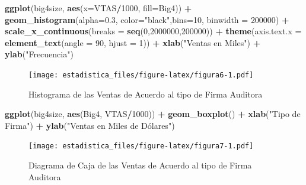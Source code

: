 \documentclass[]{book}
\newenvironment{Shaded}{\begin{snugshade}}{\end{snugshade}}
\newcommand{\KeywordTok}[1]{\textcolor[rgb]{0.13,0.29,0.53}{\textbf{#1}}}
\newcommand{\DataTypeTok}[1]{\textcolor[rgb]{0.13,0.29,0.53}{#1}}
\newcommand{\DecValTok}[1]{\textcolor[rgb]{0.00,0.00,0.81}{#1}}
\newcommand{\FloatTok}[1]{\textcolor[rgb]{0.00,0.00,0.81}{#1}}
\newcommand{\StringTok}[1]{\textcolor[rgb]{0.31,0.60,0.02}{#1}}
\newcommand{\OperatorTok}[1]{\textcolor[rgb]{0.81,0.36,0.00}{\textbf{#1}}}
\newcommand{\NormalTok}[1]{#1}
\begin{document}
\begin{Shaded}
\begin{Highlighting}[]
\KeywordTok{ggplot}\NormalTok{(big4size, }\KeywordTok{aes}\NormalTok{(}\DataTypeTok{x=}\NormalTok{VTAS}\OperatorTok{/}\DecValTok{1000}\NormalTok{, }\DataTypeTok{fill=}\NormalTok{Big4)) }\OperatorTok{+}\StringTok{ }
\StringTok{  }\KeywordTok{geom_histogram}\NormalTok{(}\DataTypeTok{alpha=}\FloatTok{0.3}\NormalTok{, }\DataTypeTok{color=}\StringTok{"black"}\NormalTok{,}\DataTypeTok{bins=}\DecValTok{10}\NormalTok{, }\DataTypeTok{binwidth =} \DecValTok{200000}\NormalTok{) }\OperatorTok{+}
\StringTok{  }\KeywordTok{scale_x_continuous}\NormalTok{(}\DataTypeTok{breaks =} \KeywordTok{seq}\NormalTok{(}\DecValTok{0}\NormalTok{,}\DecValTok{2000000}\NormalTok{,}\DecValTok{200000}\NormalTok{)) }\OperatorTok{+}
\StringTok{  }\KeywordTok{theme}\NormalTok{(}\DataTypeTok{axis.text.x =} \KeywordTok{element_text}\NormalTok{(}\DataTypeTok{angle =} \DecValTok{90}\NormalTok{, }\DataTypeTok{hjust =} \DecValTok{1}\NormalTok{)) }\OperatorTok{+}
\StringTok{  }\KeywordTok{xlab}\NormalTok{(}\StringTok{"Ventas en Miles"}\NormalTok{) }\OperatorTok{+}\StringTok{ }\KeywordTok{ylab}\NormalTok{(}\StringTok{"Frecuencia"}\NormalTok{) }
\end{Highlighting}
\end{Shaded}

\begin{figure}
\centering
\texttt{[image: estadistica\_files/figure-latex/figura6-1.pdf]}
\caption{\label{fig:figura6}Histograma de las Ventas de Acuerdo al tipo de
Firma Auditora}
\end{figure}

\begin{Shaded}
\begin{Highlighting}[]
\KeywordTok{ggplot}\NormalTok{(big4size, }\KeywordTok{aes}\NormalTok{(Big4, VTAS}\OperatorTok{/}\DecValTok{1000}\NormalTok{)) }\OperatorTok{+}\StringTok{ }
\StringTok{  }\KeywordTok{geom_boxplot}\NormalTok{() }\OperatorTok{+}\StringTok{ }\KeywordTok{xlab}\NormalTok{(}\StringTok{"Tipo de Firma"}\NormalTok{) }\OperatorTok{+}
\StringTok{  }\KeywordTok{ylab}\NormalTok{(}\StringTok{"Ventas en Miles de Dólares")}
\end{Highlighting}
\end{Shaded}

\begin{figure}
\centering
\texttt{[image: estadistica\_files/figure-latex/figura7-1.pdf]}
\caption{\label{fig:figura7}Diagrama de Caja de las Ventas de Acuerdo al
tipo de Firma Auditora}
\end{figure}
\end{document}
